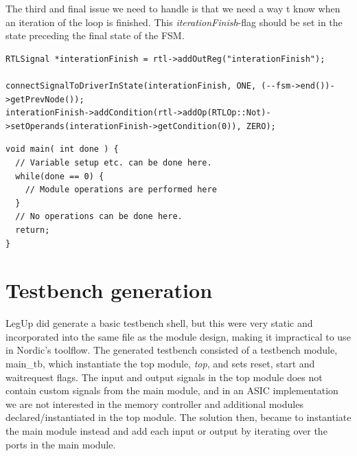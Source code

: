 The third and final issue we need to handle is that we need a way t know when an iteration of the loop is finished. This \textit{iterationFinish}-flag should be set in the state preceding the final state of the FSM.
\lstset{language=C,style=Cstyle}
\begin{lstlisting}
RTLSignal *interationFinish = rtl->addOutReg("interationFinish");

connectSignalToDriverInState(interationFinish, ONE, (--fsm->end())->getPrevNode());
interationFinish->addCondition(rtl->addOp(RTLOp::Not)->setOperands(interationFinish->getCondition(0)), ZERO);
\end{lstlisting}
\begin{lstlisting}[caption={FIR-filter implemented in C},label=lst:firfilterc]
void main( int done ) {
  // Variable setup etc. can be done here.
  while(done == 0) {
    // Module operations are performed here
  }
  // No operations can be done here.
  return;
}
\end{lstlisting}

\section{\label{subsec:tbgen}Testbench generation}
LegUp did generate a basic testbench shell, but this were very static and incorporated into the same file as the module design, making it impractical to use in Nordic's toolflow. The generated testbench consisted of a testbench module, main\_tb, which instantiate the top module, \textit{top}, and sets reset, start and waitrequest flags. The input and output signals in the top module does not contain custom signals from the main module, and in an ASIC implementation we are not interested in the memory controller and additional modules declared/instantiated in the top module. The solution then, became to instantiate the main module instead and add each input or output by iterating over the ports in the main module.

